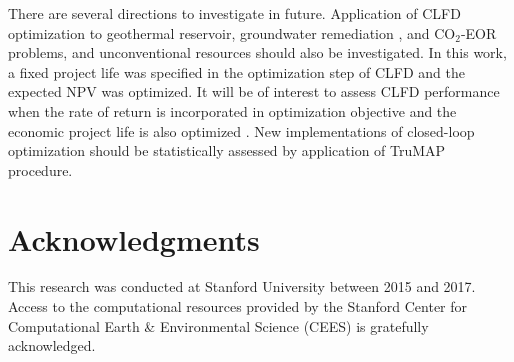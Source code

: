\documentclass[11pt]{article}
\begin{document}

There are several directions to investigate in future.
Application of CLFD optimization to geothermal reservoir, groundwater remediation \citep{bayer:08,ghorbanidehno:17},
and CO$_2$-EOR problems, and unconventional resources \citep{shirangi:19} should also be investigated.
In this work, a fixed project life was specified in the optimization step of CLFD and the expected NPV was optimized.
It will be of interest to
assess CLFD performance when the rate of return is incorporated in optimization objective and
the economic project life is also optimized \citep{shirangi:17b}.
New implementations of closed-loop optimization should be statistically assessed by application of TruMAP procedure.


\section*{Acknowledgments}
This research was conducted at Stanford University between 2015 and 2017.
Access to the computational resources provided by the Stanford Center for Computational Earth \& Environmental Science (CEES)
is gratefully acknowledged.
\end{document}
